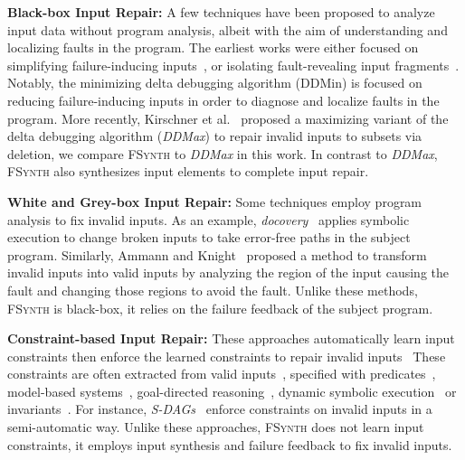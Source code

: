 \documentclass[sigconf,review,anonymous]{acmart}
\newcommand{\ddmin}{\textit{ddmin}\xspace}
\newcommand{\approach}{\textsc{FSynth}\xspace}
\def\ddmin{DDMin\xspace}
\newcommand{\ddmax}{\textit{DDMax}\xspace}
\begin{document}
\noindent
\textbf{Black-box Input Repair:} 
A few techniques have been proposed to analyze input data without program analysis, albeit with the aim of understanding and localizing faults in the program. The earliest works were either focused on simplifying failure-inducing inputs~\cite{zeller2002simplifying, clause2009penumbra}, or isolating fault-revealing input fragments~\cite{hierarchicalDD, sterling2007automated}. Notably, the minimizing delta debugging algorithm (\ddmin) is focused on reducing failure-inducing inputs in order to diagnose and localize faults in the program. More recently, Kirschner et al.~\cite{kirschner2020debugging} proposed a maximizing variant of the delta debugging algorithm (\ddmax) to repair invalid inputs to subsets via deletion, we compare \approach to \ddmax in this work. In contrast to \ddmax, \approach also synthesizes input elements to complete input repair. 


\noindent
\textbf{White and Grey-box Input Repair:} Some techniques employ program analysis to fix invalid inputs. As an example, \emph{docovery}~\cite{docovery:ase14} applies symbolic execution to change broken inputs to take error-free paths in the subject program. Similarly, Ammann and Knight~\cite{data_diversity} proposed a method to transform invalid inputs into valid inputs by analyzing the region of the input causing the fault and changing those regions to avoid the fault. Unlike these methods, \approach 
is black-box, it relies on the failure feedback of the subject program. 


\noindent
\textbf{Constraint-based Input Repair:} %
These approaches automatically learn input constraints then enforce the learned constraints to repair invalid inputs~\cite{hussain2010dynamic, Demsky:2006:IED:1146238.1146266} 
These constraints are often extracted from valid inputs~\cite{Long:2012:AIR:2337223.2337233, Rinard:2007:LCZ:1297027.1297072}, specified with predicates~\cite{elkarablieh2008juzi}, model-based systems~\cite{Demsky:2003:ADR:949343.949314}, goal-directed reasoning~\cite{1553560}, dynamic symbolic execution~\cite{hussain2010dynamic} or invariants~\cite{Demsky:2006:IED:1146238.1146266}. For instance, \emph{S-DAGs}~\cite{scheffczyk2004s} enforce constraints on invalid inputs in a semi-automatic way. Unlike these approaches, \approach does not learn input constraints, it employs input synthesis and failure feedback to fix invalid inputs. 
\end{document}
